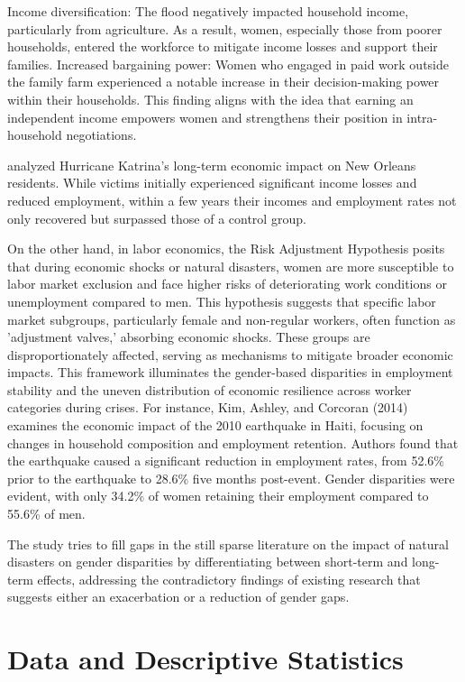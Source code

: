 \documentclass[12pt,halfline,a4paper]{ouparticle}
\begin{document}
Income diversification: The flood negatively impacted household income, particularly from agriculture. As a result, women, especially those from poorer households, entered the workforce to mitigate income losses and support their families.
Increased bargaining power: Women who engaged in paid work outside the family farm experienced a notable increase in their decision-making power within their households. This finding aligns with the idea that earning an independent income empowers women and strengthens their position in intra-household negotiations.

 \citet{Deryugina2018TheReturns} analyzed Hurricane Katrina's long-term economic impact on New Orleans residents. While victims initially experienced significant income losses and reduced employment, within a few years their incomes and employment rates not only recovered but surpassed those of a control group.

On the other hand, in labor economics, the Risk Adjustment Hypothesis posits that during economic shocks or natural disasters, women are more susceptible to labor market exclusion and face higher risks of deteriorating work conditions or unemployment compared to men. This hypothesis suggests that specific labor market subgroups, particularly female and non-regular workers, often function as 'adjustment valves,' absorbing economic shocks. These groups are disproportionately affected, serving as mechanisms to mitigate broader economic impacts. This framework illuminates the gender-based disparities in employment stability and the uneven distribution of economic resilience across worker categories during crises. For instance, Kim, Ashley, and Corcoran (2014) examines the economic impact of the 2010 earthquake in Haiti, focusing on changes in household composition and employment retention. Authors found that the earthquake caused a significant reduction in employment rates, from 52.6\% prior to the earthquake to 28.6\% five months post-event. Gender disparities were evident, with only 34.2\% of women retaining their employment compared to 55.6\% of men. 


The study tries to fill gaps in the still sparse literature on the impact of natural disasters on gender disparities by differentiating between short-term and long-term effects, addressing the contradictory findings of existing research that suggests either an exacerbation or a reduction of gender gaps.


\section{Data and Descriptive Statistics}
\label{sec4}
\end{document}

